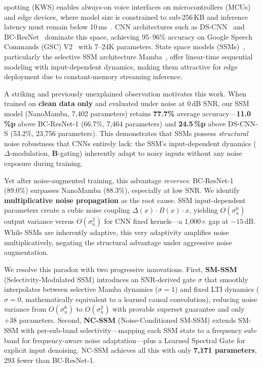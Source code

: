 \documentclass[journal]{IEEEtran}
\begin{document}
 spotting (KWS) enables always-on voice interfaces on microcontrollers (MCUs) and edge devices, where model size is constrained to sub-256\,KB and inference latency must remain below 10\,ms~\cite{banbury2021mlperf,lin2020mcunet}.
CNN architectures such as DS-CNN~\cite{zhang2017hello} and BC-ResNet~\cite{kim2021bcresnet} dominate this space, achieving 95--96\% accuracy on Google Speech Commands (GSC) V2~\cite{warden2018speech} with 7--24K parameters.
State space models (SSMs)~\cite{gu2024mamba,gu2022efficiently}, particularly the selective SSM architecture Mamba~\cite{gu2024mamba}, offer linear-time sequential modeling with input-dependent dynamics, making them attractive for edge deployment due to constant-memory streaming inference.

A striking and previously unexplained observation motivates this work.
When trained on \textbf{clean data only} and evaluated under noise at 0\,dB SNR, our SSM model (NanoMamba, 7{,}402 parameters) retains \textbf{77.7\%} average accuracy---\textbf{11.0\,\%p} above BC-ResNet-1 (66.7\%, 7{,}464 parameters) and \textbf{24.5\,\%p} above DS-CNN-S (53.2\%, 23{,}756 parameters).
This demonstrates that SSMs possess \emph{structural} noise robustness that CNNs entirely lack: the SSM's input-dependent dynamics ($\Delta$-modulation, $\mathbf{B}$-gating) inherently adapt to noisy inputs without any noise exposure during training.

Yet after noise-augmented training, this advantage \emph{reverses}: BC-ResNet-1 (89.0\%) surpasses NanoMamba (88.3\%), especially at low SNR.
We identify \textbf{multiplicative noise propagation} as the root cause.
SSM input-dependent parameters create a cubic noise coupling $\Delta(x) \cdot B(x) \cdot x$, yielding $O(\sigma_n^6)$ output variance versus $O(\sigma_n^2)$ for CNN fixed kernels---a 1{,}000$\times$ gap at $-15$\,dB.
While SSMs are inherently adaptive, this very adaptivity amplifies noise multiplicatively, negating the structural advantage under aggressive noise augmentation.

We resolve this paradox with two progressive innovations.
First, \textbf{SM-SSM} (Selectivity-Modulated SSM) introduces an SNR-derived gate $\sigma$ that smoothly interpolates between selective Mamba dynamics ($\sigma{=}1$) and fixed LTI dynamics ($\sigma{=}0$, mathematically equivalent to a learned causal convolution), reducing noise variance from $O(\sigma_n^6)$ to $O(\sigma_n^2)$ with provable superset guarantee and only +38 parameters.
Second, \textbf{NC-SSM} (Noise-Conditioned SM-SSM) extends SM-SSM with per-sub-band selectivity---mapping each SSM state to a frequency sub-band for frequency-aware noise adaptation---plus a Learned Spectral Gate for explicit input denoising.
NC-SSM achieves all this with only \textbf{7{,}171 parameters}, 293 fewer than BC-ResNet-1.
\end{document}
